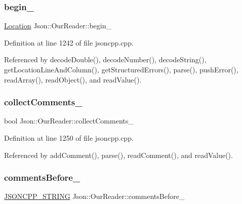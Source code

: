 \subsubsection{\texorpdfstring{begin\+\_\+}{begin\_}}
{\footnotesize\ttfamily \hyperlink{class_json_1_1_our_reader_a1bdc7bbc52ba87cae6b19746f2ee0189}{Location} Json\+::\+Our\+Reader\+::begin\+\_\+\hspace{0.3cm}{\ttfamily [private]}}



Definition at line 1242 of file jsoncpp.\+cpp.



Referenced by decode\+Double(), decode\+Number(), decode\+String(), get\+Location\+Line\+And\+Column(), get\+Structured\+Errors(), parse(), push\+Error(), read\+Array(), read\+Object(), and read\+Value().

\mbox{\label{class_json_1_1_our_reader_a259f6ac988da2894bcafc670e42f73ad}} 
\subsubsection{\texorpdfstring{collect\+Comments\+\_\+}{collectComments\_}}
{\footnotesize\ttfamily bool Json\+::\+Our\+Reader\+::collect\+Comments\+\_\+\hspace{0.3cm}{\ttfamily [private]}}



Definition at line 1250 of file jsoncpp.\+cpp.



Referenced by add\+Comment(), parse(), read\+Comment(), and read\+Value().

\mbox{\label{class_json_1_1_our_reader_a9c53e77e290eb9081298210a955fda6a}} 
\subsubsection{\texorpdfstring{comments\+Before\+\_\+}{commentsBefore\_}}
{\footnotesize\ttfamily \hyperlink{json_8h_a1e723f95759de062585bc4a8fd3fa4be}{J\+S\+O\+N\+C\+P\+P\+\_\+\+S\+T\+R\+I\+NG} Json\+::\+Our\+Reader\+::comments\+Before\+\_\+\hspace{0.3cm}{\ttfamily [private]}}



